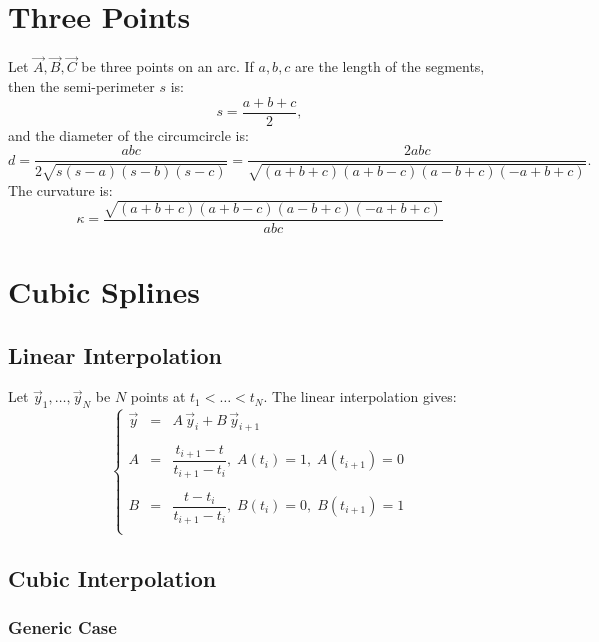 \documentclass[aps,12pt]{revtex4}
\begin{document}
\section{Three Points}

Let $\vec{A}, \vec{B}, \vec{C}$ be three points on an arc.
If $a,b,c$ are the length of the segments, then the semi-perimeter $s$ is:
\begin{equation}
s = \dfrac{a+b+c}{2},
\end{equation}
and the diameter of the circumcircle is:
\begin{equation}
	d = \dfrac{abc}{2\sqrt{s(s-a)(s-b)(s-c)}} = \dfrac{2abc}{\sqrt{(a+b+c)(a+b-c)(a-b+c)(-a+b+c)}}.
\end{equation}
The curvature is:
\begin{equation}
	\kappa = \dfrac{\sqrt{(a+b+c)(a+b-c)(a-b+c)(-a+b+c)}}{abc}
\end{equation}

\section{Cubic Splines}

\subsection{Linear Interpolation}
Let $\vec{y}_1,\ldots,\vec{y}_{N}$ be $N$ points at $t_1<\ldots<t_N$.
The linear interpolation gives:
\begin{equation}
\left\lbrace
\begin{array}{rcl}
	\vec{y} & = & A \, \vec{y}_i + B \, \vec{y}_{i+1} \\
	\\
	A & = & \dfrac{t_{i+1}-t}{t_{i+1}-t_i}, \; A(t_i) = 1,\;A(t_{i+1})=0\\
	\\
	B & = & \dfrac{t-t_i}{t_{i+1}-t_i}, \; B(t_i) = 0,\;B(t_{i+1})=1\\
	\end{array}
\right.
\end{equation}


\subsection{Cubic Interpolation}

\subsubsection{Generic Case}
\end{document}
